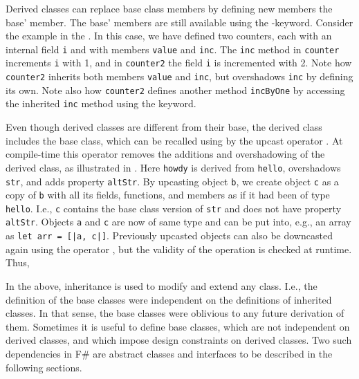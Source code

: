 Derived classes can replace base class members by defining new members  the base' member. The base' members are still available using the -keyword. Consider the example in the .
%
%
In this case, we have defined two counters, each with an internal field \lstinline{i} and with members \lstinline{value} and \lstinline{inc}. The \lstinline{inc} method in \lstinline{counter} increments \lstinline{i} with 1, and in \lstinline{counter2} the field \lstinline{i} is incremented with 2. Note how \lstinline{counter2} inherits both members \lstinline{value} and \lstinline{inc}, but overshadows \lstinline{inc} by defining its own. Note also how \lstinline{counter2} defines another method \lstinline{incByOne} by accessing the inherited \lstinline{inc} method using the  keyword.

Even though derived classes are different from their base, the derived class includes the base class, which can be recalled using  by the upcast operator \idx[:>@\lstinline{:>}]{\lexeme{:>}}. At compile-time this operator removes the additions and overshadowing of the derived class, as illustrated in . 
%
%
Here \lstinline{howdy} is derived from \lstinline{hello}, overshadows \lstinline{str}, and adds property \lstinline{altStr}. By upcasting object \lstinline{b}, we create object \lstinline{c} as a copy of \lstinline{b} with all its fields, functions, and members as if it had been of type \lstinline{hello}. I.e., \lstinline{c} contains the base class version of \lstinline{str} and does not have property \lstinline{altStr}. Objects \lstinline{a} and \lstinline{c} are now of same type and can be put into, e.g., an array as \lstinline{let arr = [|a, c|]}. Previously upcasted objects can also be downcasted again using the  operator , but the validity of the operation is checked at runtime. Thus, 

In the above, inheritance is used to modify and extend any class. I.e., the definition of the base classes were independent on the definitions of inherited classes. In that sense, the base classes were oblivious to any future derivation of them. Sometimes it is useful to define base classes, which are not independent on derived classes, and which impose design constraints on derived classes. Two such dependencies in F\# are abstract classes and interfaces to be described in the following sections.


